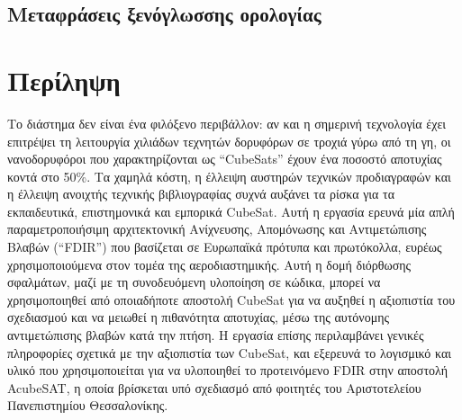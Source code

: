 \documentclass[a4paper,nobib]{tufte-book}
\begin{document}
\begin{fullwidth}
\listoffigures

\listoftables

\chapter*{Μεταφράσεις ξενόγλωσσης ορολογίας}

\bgroup
\setlength\parskip{1.5ex}
\acuseall
\printacronyms[include=glossary,template=glossary]
\acresetall  %
\egroup

\bgroup
\setlength\parskip{1ex}
\printacronyms[pages={display=all,seq/use=false},exclude = {glossary},name = {Ακρωνύμια}]
\egroup

\end{fullwidth}

\cleardoublepage

\chapter*{Περίληψη}


\justify
Το διάστημα δεν είναι ένα φιλόξενο περιβάλλον: αν και η σημερινή τεχνολογία έχει επιτρέψει τη λειτουργία χιλιάδων τεχνητών δο\-ρυ\-φό\-ρων σε τροχιά γύρω από τη γη, οι νανοδορυφόροι που χαρακτηρίζονται ως “CubeSats” έχουν ένα ποσοστό αποτυχίας κοντά στο 50\%. Τα χαμηλά κόστη, η έλλειψη αυστηρών τεχνικών προδιαγραφών και η έλλειψη ανοιχτής τεχνικής βιβλιογραφίας συχνά αυξάνει τα ρίσκα για τα εκπαιδευτικά, επιστημονικά και εμπορικά CubeSat. Αυτή η εργασία ερευνά μία απλή παραμετροποιήσιμη αρχιτεκτονική Ανίχνευσης, Απομόνωσης και Αντιμετώπισης Βλαβών (“FDIR”) που βασίζεται σε Ευρωπαϊκά πρότυπα και πρωτόκολλα, ευρέως χρησιμοποιούμενα στον τομέα της αεροδιαστημικής. Αυτή η δομή διόρθωσης σφαλμάτων, μαζί με τη συνοδευόμενη υλοποίηση σε κώδικα, μπορεί να χρησιμοποιηθεί από οποιαδήποτε αποστολή CubeSat για να αυξηθεί η αξιοπιστία του σχεδιασμού και να μειωθεί η πιθανότητα αποτυχίας, μέσω της αυτόνομης αντιμετώπισης βλαβών κατά την πτήση. Η εργασία επίσης περιλαμβάνει γενικές πληροφορίες σχετικά με την αξιοπιστία των CubeSat, και εξερευνά το λογισμικό και υλικό που χρησιμοποιείται για να υλοποιηθεί το προτεινόμενο FDIR στην αποστολή AcubeSAT, η οποία βρίσκεται υπό σχεδιασμό από φοιτητές του Αριστοτελείου Πανεπιστημίου Θεσσαλονίκης.
\end{document}
